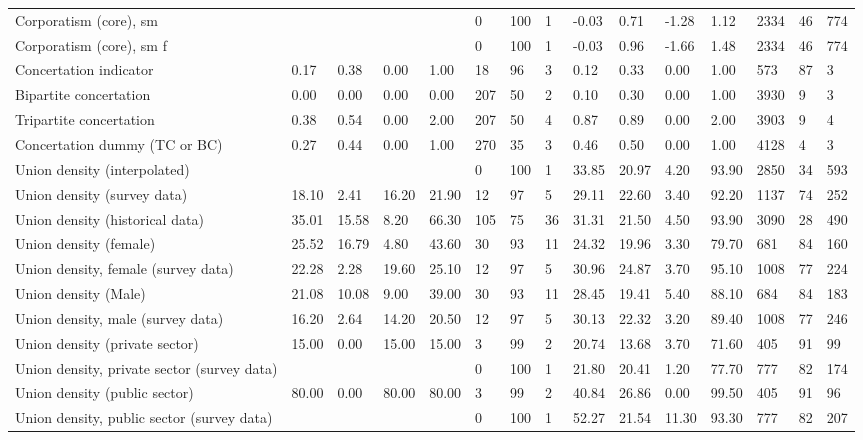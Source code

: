 \begin{longtable}{lllllllllllllll}
\addlinespace
Corporatism (core), sm &  &  &  &  & 0 & 100 & 1 & -0.03 & 0.71 & -1.28 & 1.12 & 2334 & 46 & 774\\
Corporatism (core), sm f &  &  &  &  & 0 & 100 & 1 & -0.03 & 0.96 & -1.66 & 1.48 & 2334 & 46 & 774\\
Concertation indicator & 0.17 & 0.38 & 0.00 & 1.00 & 18 & 96 & 3 & 0.12 & 0.33 & 0.00 & 1.00 & 573 & 87 & 3\\
Bipartite concertation & 0.00 & 0.00 & 0.00 & 0.00 & 207 & 50 & 2 & 0.10 & 0.30 & 0.00 & 1.00 & 3930 & 9 & 3\\
Tripartite concertation & 0.38 & 0.54 & 0.00 & 2.00 & 207 & 50 & 4 & 0.87 & 0.89 & 0.00 & 2.00 & 3903 & 9 & 4\\
\addlinespace
Concertation dummy (TC or BC) & 0.27 & 0.44 & 0.00 & 1.00 & 270 & 35 & 3 & 0.46 & 0.50 & 0.00 & 1.00 & 4128 & 4 & 3\\
Union density (interpolated) &  &  &  &  & 0 & 100 & 1 & 33.85 & 20.97 & 4.20 & 93.90 & 2850 & 34 & 593\\
Union density (survey data) & 18.10 & 2.41 & 16.20 & 21.90 & 12 & 97 & 5 & 29.11 & 22.60 & 3.40 & 92.20 & 1137 & 74 & 252\\
Union density (historical data) & 35.01 & 15.58 & 8.20 & 66.30 & 105 & 75 & 36 & 31.31 & 21.50 & 4.50 & 93.90 & 3090 & 28 & 490\\
Union density (female) & 25.52 & 16.79 & 4.80 & 43.60 & 30 & 93 & 11 & 24.32 & 19.96 & 3.30 & 79.70 & 681 & 84 & 160\\
\addlinespace
Union density, female (survey data) & 22.28 & 2.28 & 19.60 & 25.10 & 12 & 97 & 5 & 30.96 & 24.87 & 3.70 & 95.10 & 1008 & 77 & 224\\
Union density (Male) & 21.08 & 10.08 & 9.00 & 39.00 & 30 & 93 & 11 & 28.45 & 19.41 & 5.40 & 88.10 & 684 & 84 & 183\\
Union density, male (survey data) & 16.20 & 2.64 & 14.20 & 20.50 & 12 & 97 & 5 & 30.13 & 22.32 & 3.20 & 89.40 & 1008 & 77 & 246\\
Union density (private sector) & 15.00 & 0.00 & 15.00 & 15.00 & 3 & 99 & 2 & 20.74 & 13.68 & 3.70 & 71.60 & 405 & 91 & 99\\
Union density, private sector (survey data) &  &  &  &  & 0 & 100 & 1 & 21.80 & 20.41 & 1.20 & 77.70 & 777 & 82 & 174\\
\addlinespace
Union density (public sector) & 80.00 & 0.00 & 80.00 & 80.00 & 3 & 99 & 2 & 40.84 & 26.86 & 0.00 & 99.50 & 405 & 91 & 96\\
Union density, public sector (survey data) &  &  &  &  & 0 & 100 & 1 & 52.27 & 21.54 & 11.30 & 93.30 & 777 & 82 & 207\\

\end{longtable}
